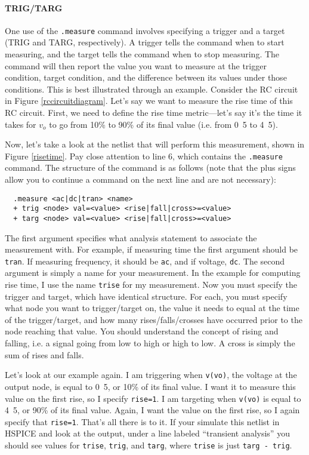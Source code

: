 \documentclass{article}
\begin{document}
\paragraph{TRIG/TARG} One use of the \verb|.measure| command involves specifying a trigger and a target (TRIG and TARG, respectively). A trigger tells the command when to start measuring, and the target tells the command when to stop measuring. The command will then report the value you want to measure at the trigger condition, target condition, and the difference between its values under those conditions. This is best illustrated through an example. Consider the RC circuit in Figure \ref{rccircuitdiagram}. Let's say we want to measure the rise time of this RC circuit. First, we need to define the rise time metric---let's say it's the time it takes for $v_o$ to go from \unit{10}{\%} to \unit{90}{\%} of its final value (i.e. from \unit{0.5}{\volt} to \unit{4.5}{\volt}).

Now, let's take a look at the netlist that will perform this measurement, shown in Figure \ref{risetime}. Pay close attention to line 6, which contains the \verb|.measure| command. The structure of the command is as follows (note that the plus signs allow you to continue a command on the next line and are not necessary):

\begin{verbatim}
  .measure <ac|dc|tran> <name>
  + trig <node> val=<value> <rise|fall|cross>=<value>
  + targ <node> val=<value> <rise|fall|cross>=<value>
\end{verbatim}

The first argument specifies what analysis statement to associate the measurement with. For example, if measuring time the first argument should be \verb|tran|. If measuring frequency, it should be \verb|ac|, and if voltage, \verb|dc|. The second argument is simply a name for your measurement. In the example for computing rise time, I use the name \verb|trise| for my measurement. Now you must specify the trigger and target, which have identical structure. For each, you must specify what node you want to trigger/target on, the value it needs to equal at the time of the trigger/target, and how many rises/falls/crosses have occurred prior to the node reaching that value. You should understand the concept of rising and falling, i.e. a signal going from low to high or high to low. A cross is simply the sum of rises and falls.

Let's look at our example again. I am triggering when \verb|v(vo)|, the voltage at the output node, is equal to \unit{0.5}{\volt}, or \unit{10}{\%} of its final value. I want it to measure this value on the first rise, so I specify \verb|rise=1|. I am targeting when \verb|v(vo)| is equal to \unit{4.5}{\volt}, or \unit{90}{\%} of its final value. Again, I want the value on the first rise, so I again specify that \verb|rise=1|. That's all there is to it. If your simulate this netlist in HSPICE and look at the output, under a line labeled ``transient analysis'' you should see values for \verb|trise|, \verb|trig|, and \verb|targ|, where \verb|trise| is just \verb|targ - trig|.
\end{document}
